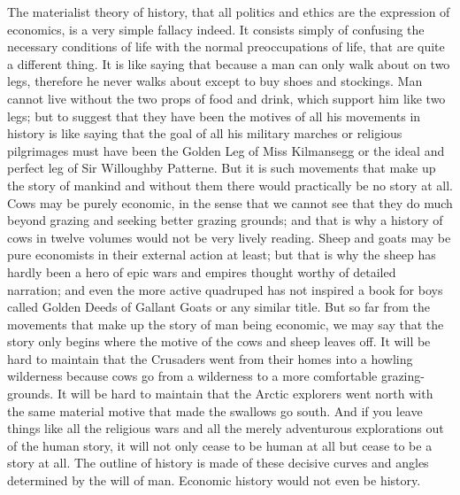 
The materialist theory of history, that all politics and ethics are the expression of economics, is a very simple fallacy indeed. It consists simply of confusing the necessary conditions of life with the normal preoccupations of life, that are quite a different thing. It is like saying that because a man can only walk about on two legs, therefore he never walks about except to buy shoes and stockings. Man cannot live without the two props of food and drink, which support him like two legs; but to suggest that they have been the motives of all his movements in history is like saying that the goal of all his military marches or religious pilgrimages must have been the Golden Leg of Miss Kilmansegg or the ideal and perfect leg of Sir Willoughby Patterne. But it is such movements that make up the story of mankind and without them there would practically be no story at all. Cows may be purely economic, in the sense that we cannot see that they do much beyond grazing and seeking better grazing grounds; and that is why a history of cows in twelve volumes would not be very lively reading. Sheep and goats may be pure economists in their external action at least; but that is why the sheep has hardly been a hero of epic wars and empires thought worthy of detailed narration; and even the more active quadruped has not inspired a book for boys called Golden Deeds of Gallant Goats or any similar title. But so far from the movements that make up the story of man being economic, we may say that the story only begins where the motive of the cows and sheep leaves off. It will be hard to maintain that the Crusaders went from their homes into a howling wilderness because cows go from a wilderness to a more comfortable grazing-grounds. It will be hard to maintain that the Arctic explorers went north with the same material motive that made the swallows go south. And if you leave things like all the religious wars and all the merely adventurous explorations out of the human story, it will not only cease to be human at all but cease to be a story at all. The outline of history is made of these decisive curves and angles determined by the will of man. Economic history would not even be history.

